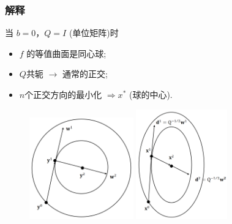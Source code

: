 \documentclass{beamer}
\begin{document}
	
	\begin{frame}
		\frametitle{解释}
		 当 $b = 0$，$Q = I$ (单位矩阵)时 %
		\begin{itemize}
			\item  $f$ 的等值曲面是同心球;
			\item  $Q$共轭 $\longrightarrow$ 通常的正交;
			\item  $n$个正交方向的最小化  $\Rightarrow x^*$ (球的中心).
		\end{itemize}
		
		\bigskip
		
		
		\begin{figure}
			\centering
			\includegraphics[width=0.4\textwidth]{conjugation1.png}
			\qquad
			\includegraphics[width=0.35\textwidth]{conjugation2.png}
		\end{figure}
		
	\end{frame}
\end{document}
